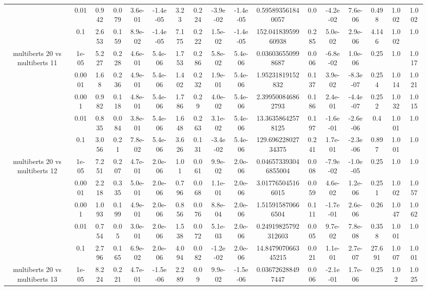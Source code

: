 \begin{tabular}{|c|c|c|c|c|c|c|c|c|c|c|c|c|c|c|c|c|}
 & 0.01 & 0.942 & 0.079 & 3.6e-01 & -1.4e-05 & 3.23 & 0.224 & -3.9e-02 & -1.4e-05 & 0.595893561840057 & 0.0 & -4.2e-02 & 7.6e-06 & 0.498 & 1.002 & 1.002 \\
 & 0.1 & 2.653 & 0.159 & 8.9e-02 & -1.4e-05 & 7.175 & 0.222 & 1.5e-02 & -1.4e-05 & 152.04183959960938 & 0.285 & 5.0e-02 & 2.9e-06 & 4.146 & 1.002 & 1.0 \\
\hline
\multirow{5}{*}{multiberts 20 vs multiberts 11} & 1e-05 & 5.227 & 0.228 & 4.6e-01 & 5.4e-06 & 1.753 & 0.286 & 5.8e-02 & 5.4e-06 & 0.036036550998687 & 0.006 & -6.8e-02 & 1.0e-06 & 0.25 & 1.0 & 1.017 \\
 & 0.0001 & 1.68 & 0.236 & 4.9e-01 & 5.4e-06 & 1.402 & 0.232 & 1.9e-01 & 5.4e-06 & 1.95231819152832 & 0.137 & 3.9e-02 & -8.3e-07 & 0.254 & 1.014 & 1.021 \\
 & 0.001 & 0.982 & 0.118 & 4.8e-01 & 5.4e-06 & 1.786 & 0.29 & 4.0e-02 & 5.4e-06 & 2.399500846862793 & 0.186 & 2.4e-01 & -4.4e-07 & 0.252 & 1.032 & 1.015 \\
 & 0.01 & 0.835 & 0.084 & 3.8e-01 & 5.4e-06 & 1.648 & 0.263 & 3.1e-02 & 5.4e-06 & 13.36358642578125 & 0.197 & -1.6e-01 & -2.6e-06 & 0.4 & 1.001 & 1.0 \\
 & 0.1 & 3.056 & 0.21 & 7.8e-02 & 5.4e-06 & 3.626 & 0.131 & -3.4e-02 & 5.4e-06 & 129.69622802734375 & 0.241 & 1.7e-01 & -2.3e-06 & 0.897 & 1.001 & 1.0 \\
\hline
\multirow{5}{*}{multiberts 20 vs multiberts 12} & 1e-05 & 7.251 & 0.207 & 4.7e-01 & 2.0e-06 & 1.01 & 0.061 & 9.9e-02 & 2.0e-06 & 0.046573393046855004 & 0.008 & -7.9e-02 & -1.0e-05 & 0.25 & 1.0 & 1.0 \\
 & 0.0001 & 2.218 & 0.335 & 5.0e-01 & 2.0e-06 & 0.796 & 0.068 & 1.1e-01 & 2.0e-06 & 3.017765045166015 & 0.059 & 4.6e-02 & 1.2e-06 & 0.251 & 1.002 & 1.057 \\
 & 0.001 & 1.093 & 0.199 & 4.9e-01 & 2.0e-06 & 0.856 & 0.076 & 8.8e-04 & 2.0e-06 & 1.515915870666504 & 0.111 & -1.7e-01 & 2.6e-06 & 0.26 & 1.047 & 1.062 \\
 & 0.01 & 0.754 & 0.05 & 3.0e-01 & 2.0e-06 & 1.538 & 0.072 & 5.1e-03 & 2.0e-06 & 0.24919825792312603 & 0.005 & 9.7e-02 & 7.8e-08 & 0.358 & 1.001 & 1.0 \\
 & 0.1 & 2.796 & 0.165 & 6.9e-02 & 2.0e-06 & 4.094 & 0.082 & -1.2e-02 & 2.0e-06 & 14.847907066345215 & 0.021 & 1.1e-01 & 2.7e-07 & 27.691 & 1.007 & 1.001 \\
\hline
\multirow{5}{*}{multiberts 20 vs multiberts 13} & 1e-05 & 8.224 & 0.221 & 4.7e-01 & -1.5e-06 & 2.289 & 0.09 & 9.9e-02 & -1.5e-06 & 0.036726288497447 & 0.006 & -2.1e-01 & 1.7e-06 & 0.25 & 1.02 & 1.025 \\

\end{tabular}
